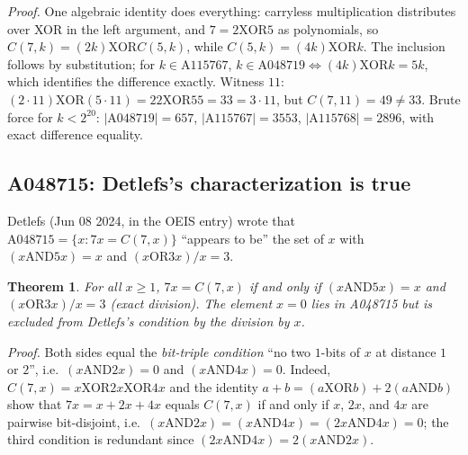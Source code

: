 \documentclass[11pt]{article}
\newtheorem{theorem}{Theorem}[section]
\newcommand{\clmul}{C} %
\begin{document}
\emph{Proof.} One algebraic identity does everything:
carryless multiplication distributes over XOR in the left argument,
and $7 = 2 \mathbin{\mathrm{XOR}} 5$ as polynomials, so
$\clmul(7,k) = (2k) \mathbin{\mathrm{XOR}} \clmul(5,k)$, while
$\clmul(5,k) = (4k) \mathbin{\mathrm{XOR}} k$. The inclusion follows by
substitution; for $k \in \mathrm{A115767}$,
$k \in \mathrm{A048719} \iff (4k) \mathbin{\mathrm{XOR}} k = 5k$,
which identifies the difference exactly. Witness $11$:
$(2 \cdot 11) \mathbin{\mathrm{XOR}} (5 \cdot 11) = 22
\mathbin{\mathrm{XOR}} 55 = 33 = 3 \cdot 11$, but $\clmul(7,11) = 49
\ne 33$. Brute force for $k < 2^{20}$: $|\mathrm{A048719}| = 657$,
$|\mathrm{A115767}| = 3553$, $|\mathrm{A115768}| = 2896$, with exact
difference equality.

\subsection{A048715: Detlefs's characterization is true}
\label{sec:a048715}
Detlefs (Jun 08 2024, in the OEIS entry) wrote that
$\mathrm{A048715} = \{x : 7x = \clmul(7,x)\}$ ``appears to be'' the set
of $x$ with $(x \mathbin{\mathrm{AND}} 5x) = x$ and $(x
\mathbin{\mathrm{OR}} 3x)/x = 3$.

\begin{theorem}
For all $x \ge 1$, $7x = \clmul(7,x)$ if and only if
$(x \mathbin{\mathrm{AND}} 5x) = x$ and $(x \mathbin{\mathrm{OR}}
3x)/x = 3$ (exact division). The element $x = 0$ lies in A048715 but
is excluded from Detlefs's condition by the division by $x$.
\end{theorem}

\emph{Proof.} Both sides equal the \emph{bit-triple
condition} ``no two $1$-bits of $x$ at distance $1$ or $2$'', i.e.\
$(x \mathbin{\mathrm{AND}} 2x) = 0$ and
$(x \mathbin{\mathrm{AND}} 4x) = 0$. Indeed, $C(7,x) = x \mathbin{\mathrm{XOR}} 2x \mathbin{\mathrm{XOR}} 4x$ and the identity $a + b = (a \mathbin{\mathrm{XOR}} b) + 2(a \mathbin{\mathrm{AND}} b)$ show that $7x = x + 2x + 4x$ equals $C(7,x)$ if and only if $x$, $2x$, and $4x$ are pairwise bit-disjoint, i.e.\ $(x \mathbin{\mathrm{AND}} 2x) = (x \mathbin{\mathrm{AND}} 4x) = (2x \mathbin{\mathrm{AND}} 4x) = 0$; the third condition is redundant since $(2x \mathbin{\mathrm{AND}} 4x) = 2(x \mathbin{\mathrm{AND}} 2x)$.
\end{document}
